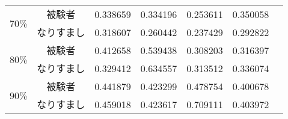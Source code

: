 \begin{center}
\begin{longtable}[btph]{|c|c|r|r|r|r|r|}
      \multirow{2}{*}{70\%} & 被験者 & 0.338659 & 0.334196 & 0.253611 & 0.350058 & \\ \cline{2-7}
           & なりすまし & 0.318607 & 0.260442 & 0.237429 & 0.292822 & \\ \hline
      \multirow{2}{*}{80\%} & 被験者 & 0.412658 & 0.539438 & 0.308203 & 0.316397 & \\ \cline{2-7}
           & なりすまし & 0.329412 & 0.634557 & 0.313512 & 0.336074 & \\ \hline
      \multirow{2}{*}{90\%} & 被験者 & 0.441879 & 0.423299 & 0.478754 & 0.400678 & \\ \cline{2-7}
           & なりすまし & 0.459018 & 0.423617 & 0.709111 & 0.403972 & \\ \hline
  \end{longtable}
\end{center}
